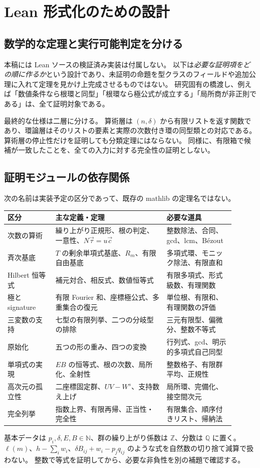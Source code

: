 \documentclass[11pt,a4paper]{ltjsarticle}
\numberwithin{equation}{section}
\theoremstyle{definition}
\newcommand{\Z}{\mathbb Z}\newcommand{\N}{\mathbb N}\newcommand{\Q}{\mathbb Q}\newcommand{\C}{\mathbb C}
\newcommand{\cc}{\vec c}\newcommand{\xx}{\vec x}\newcommand{\om}{\vec\omega}\newcommand{\ta}{\vec\tau}
\begin{document}
\section{Lean 形式化のための設計}\label{sec:lean}
\subsection{数学的な定理と実行可能判定を分ける}
本稿には Lean ソースの検証済み実装は付属しない。
以下は\emph{必要な証明項をどの順に作るか}という設計であり、未証明の命題を型クラスのフィールドや追加公理に入れて定理を見かけ上完成させるものではない。
研究固有の橋渡し、例えば「数値条件なら根環と同型」「根環なら極公式が成立する」「局所商が非正則である」は、全て証明対象である。

最終的な仕様は二層に分ける。
算術層は $(n,\delta)$ から有限リストを返す関数であり、環論層はそのリストの要素と実際の次数付き環の同型類との対応である。
算術層の停止性だけを証明しても分類定理にはならない。
同様に、有限箱で候補が一致したことを、全ての入力に対する完全性の証明としない。

\subsection{証明モジュールの依存関係}
次の名前は実装予定の区分であって、既存の mathlib の定理名ではない。
\begin{center}\small
\begin{longtable}{p{0.19\linewidth}p{0.44\linewidth}p{0.27\linewidth}}
\toprule
区分 & 主な定義・定理 & 必要な道具\\\midrule\endhead
次数の算術 & 繰り上がり正規形、根の判定、一意性、$N\ta=u\cc$ & 整数除法、合同、gcd、lcm、Bézout\\
斉次基底 & $T$ の剰余単項式基底、$R_m$、有限自由基底 & 多項式環、モニック除法、有限直和\\
Hilbert 恒等式 & 補元対合、相反式、数値恒等式 & 有限多項式、形式級数、有理関数\\
極と signature & 有限 Fourier 和、座標極公式、多重集合の復元 & 単位根、有限和、有理関数の評価\\
三変数の支持 & 七型の有限列挙、二つの分岐型の排除 & 三元有限型、偏微分、整数不等式\\
原始化 & 五つの形の重み、四つの変換 & 行列式、gcd、明示的多項式自己同型\\
単項式の実現 & $EB$ の恒等式、根の次数、局所化、全射性 & 整数格子、有限群平均、正規性\\
高次元の孤立性 & 二座標固定群、$UV-W^s$、支持数え上げ & 局所環、完備化、接空間次元\\
完全列挙 & 指数上界、有限再帰、正当性・完全性 & 有限集合、順序付きリスト、帰納法\\\bottomrule
\end{longtable}
\end{center}
基本データは $p_i,\delta,E,B\in\N$、群の繰り上がり係数は $\Z$、分数は $\Q$ に置く。
$\ell(m)$、$h-\sum_iw_i$、$\delta B_{ij}+w_i-p_jq_{ij}$ のような式を自然数の切り捨て減算で扱わない。
整数で等式を証明してから、必要な非負性を別の補題で確認する。
\end{document}
